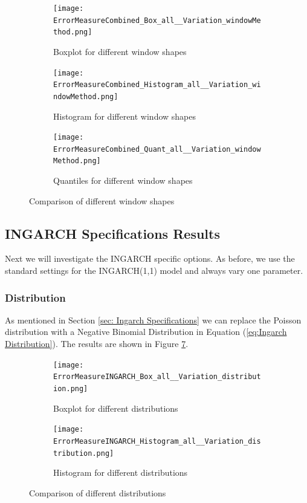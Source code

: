 \begin{figure}[htb!]
\centering
\begin{subfigure}[b]{0.4\textwidth}
\texttt{[image: ErrorMeasureCombined\_Box\_all\_\_Variation\_windowMethod.png]}
\caption{Boxplot for different window shapes}
\label{fig:window methods Box}
\end{subfigure}
\hfill
\begin{subfigure}[b]{0.4\textwidth}
\texttt{[image: ErrorMeasureCombined\_Histogram\_all\_\_Variation\_windowMethod.png]}
\caption{Histogram for different window shapes}
\label{fig:window methods Hist}
\end{subfigure}
\hfill
\begin{subfigure}[b]{0.5\textwidth}
\texttt{[image: ErrorMeasureCombined\_Quant\_all\_\_Variation\_windowMethod.png]}
\caption{Quantiles for different window shapes}
\label{fig:window methods Quant}
\end{subfigure}
\caption{Comparison of different window shapes}
\label{fig:window methods Comp1}
\end{figure}


\subsection{INGARCH Specifications Results}
\label{sec: Ingarch Specifications Results}

Next we will investigate the INGARCH specific options. As before, we use the standard settings for the INGARCH(1,1) model and always vary one parameter. 

\subsubsection{Distribution}
\label{sec:Distribution}

As mentioned in Section \ref{sec: Ingarch Specifications} we can replace the Poisson distribution with a Negative Binomial Distribution in Equation (\ref{eq:Ingarch Distribution}). The results are shown in Figure \ref{fig:distributions Comp1}. 

\begin{figure}[htb!]
\centering
\begin{subfigure}[b]{0.45\textwidth}
\texttt{[image: ErrorMeasureINGARCH\_Box\_all\_\_Variation\_distribution.png]}
\caption{Boxplot for different distributions}
\label{fig:distributions Box}
\end{subfigure}
\hfill
\begin{subfigure}[b]{0.45\textwidth}
\texttt{[image: ErrorMeasureINGARCH\_Histogram\_all\_\_Variation\_distribution.png]}
\caption{Histogram for different distributions}
\label{fig:distributions Hist}
\end{subfigure}
\hfill
\caption{Comparison of different distributions}
\label{fig:distributions Comp1}
\end{figure}

